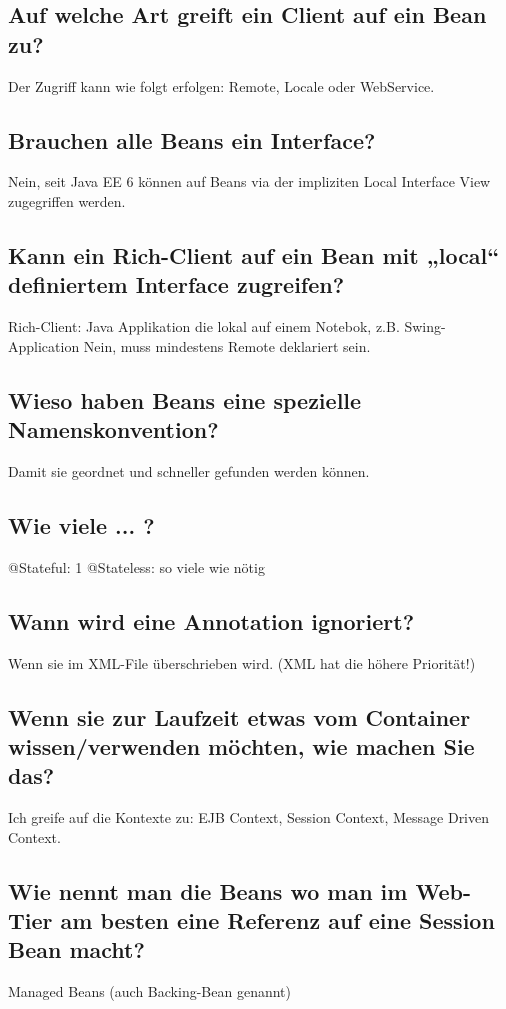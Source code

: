 \subsection{Auf welche Art greift ein Client auf ein Bean zu?}
Der Zugriff kann wie folgt erfolgen: Remote, Locale oder WebService.

\subsection{Brauchen alle Beans ein Interface?}
Nein, seit Java EE 6 können auf Beans via der impliziten Local Interface View zugegriffen werden.

\subsection{Kann ein Rich-Client auf ein Bean mit „local“ definiertem Interface zugreifen?}
Rich-Client: Java Applikation die lokal auf einem Notebok, z.B. Swing-Application
Nein, muss mindestens Remote deklariert sein.

\subsection{Wieso haben Beans eine spezielle Namenskonvention?}
Damit sie geordnet und schneller gefunden werden können.

\subsection{Wie viele ... ?}
@Stateful: 1
@Stateless: so viele wie nötig

\subsection{Wann wird eine Annotation ignoriert?}
Wenn sie im XML-File überschrieben wird. (XML hat die höhere Priorität!)

\subsection{Wenn sie zur Laufzeit etwas vom Container wissen/verwenden möchten, wie machen Sie das?}
Ich greife auf die Kontexte zu: EJB Context, Session Context, Message Driven Context.

\subsection{Wie nennt man die Beans wo man im Web-Tier am besten eine Referenz auf eine Session Bean macht?}
Managed Beans (auch Backing-Bean genannt)
